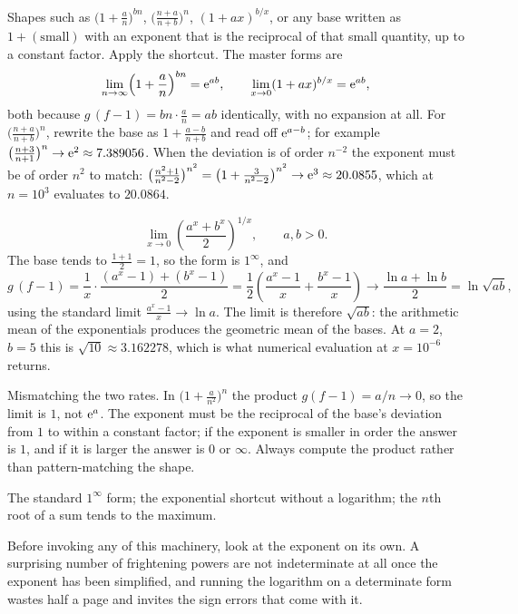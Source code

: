 \cue Shapes such as $\bigl(1+\tfrac an\bigr)^{bn}$, $\bigl(\tfrac{n+a}{n+b}\bigr)^{n}$, $(1+ax)^{b/x}$, or any base written as $1+(\text{small})$ with an exponent that is the reciprocal of that small quantity, up to a constant factor.
\method Apply the shortcut. The master forms are
\[\lim_{n\to\infty}\Bigl(1+\frac an\Bigr)^{bn}=\mathrm{e}^{ab},\qquad \lim_{x\to0}(1+ax)^{b/x}=\mathrm{e}^{ab},\]
both because $g\,(f-1)=bn\cdot\tfrac an=ab$ identically, with no expansion at all. For $\bigl(\tfrac{n+a}{n+b}\bigr)^{n}$, rewrite the base as $1+\tfrac{a-b}{n+b}$ and read off $\mathrm{e}^{a-b}$; for example $\bigl(\tfrac{n+3}{n+1}\bigr)^{n}\to\mathrm{e}^{2}\approx7.389056$. When the deviation is of order $n^{-2}$ the exponent must be of order $n^{2}$ to match: $\bigl(\tfrac{n^{2}+1}{n^{2}-2}\bigr)^{n^{2}}=\bigl(1+\tfrac{3}{n^{2}-2}\bigr)^{n^{2}}\to\mathrm{e}^{3}\approx20.0855$, which at $n=10^{3}$ evaluates to $20.0864$.

\begin{worked}
\[\lim_{x\to0}\left(\frac{a^{x}+b^{x}}{2}\right)^{1/x},\qquad a,b>0.\]
The base tends to $\tfrac{1+1}{2}=1$, so the form is $1^{\infty}$, and
\[g\,(f-1)=\frac1x\cdot\frac{(a^{x}-1)+(b^{x}-1)}{2}=\frac12\left(\frac{a^{x}-1}{x}+\frac{b^{x}-1}{x}\right)\longrightarrow\frac{\ln a+\ln b}{2}=\ln\sqrt{ab},\]
using the standard limit $\tfrac{a^{x}-1}{x}\to\ln a$. The limit is therefore $\sqrt{ab}$: the arithmetic mean of the exponentials produces the geometric mean of the bases. At $a=2$, $b=5$ this is $\sqrt{10}\approx3.162278$, which is what numerical evaluation at $x=10^{-6}$ returns.
\end{worked}

\begin{trap}
Mismatching the two rates. In $\bigl(1+\tfrac{a}{n^{2}}\bigr)^{n}$ the product $g(f-1)=a/n\to0$, so the limit is $1$, not $\mathrm{e}^{a}$. The exponent must be the reciprocal of the base's deviation from $1$ to within a constant factor; if the exponent is smaller in order the answer is $1$, and if it is larger the answer is $0$ or $\infty$. Always compute the product rather than pattern-matching the shape.
\end{trap}

\begin{seealsob}The standard $1^{\infty}$ form; the exponential shortcut without a logarithm; the $n$th root of a sum tends to the maximum.\end{seealsob}

Before invoking any of this machinery, look at the exponent on its own. A surprising number of frightening powers are not indeterminate at all once the exponent has been simplified, and running the logarithm on a determinate form wastes half a page and invites the sign errors that come with it.

